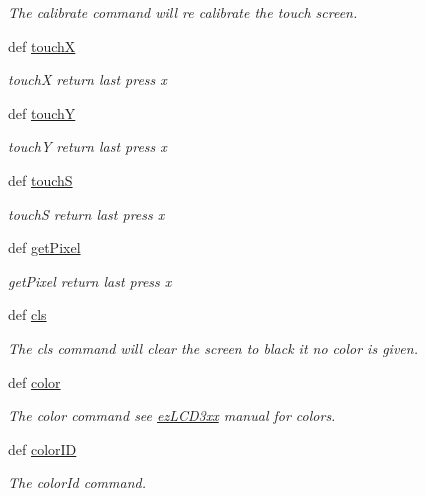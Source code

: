 \begin{DoxyCompactItemize}
\begin{DoxyCompactList}\small\item\em The calibrate command will re calibrate the touch screen. \end{DoxyCompactList}\item 
def \hyperlink{group___general_ga57f60e1c88c6963a00e45c55e9950336}{touch\-X}
\begin{DoxyCompactList}\small\item\em touch\-X return last press x \end{DoxyCompactList}\item 
def \hyperlink{group___general_ga57d446717fa3289cd0153b491334d697}{touch\-Y}
\begin{DoxyCompactList}\small\item\em touch\-Y return last press x \end{DoxyCompactList}\item 
def \hyperlink{group___general_ga658420cb53a746e3821803b240447303}{touch\-S}
\begin{DoxyCompactList}\small\item\em touch\-S return last press x \end{DoxyCompactList}\item 
def \hyperlink{group___general_gae94e11a411afe5e9c92d94be3fc5a252}{get\-Pixel}
\begin{DoxyCompactList}\small\item\em get\-Pixel return last press x \end{DoxyCompactList}\item 
def \hyperlink{group___drawing_ga3524b7a565ceaa5e5290a94e870073be}{cls}
\begin{DoxyCompactList}\small\item\em The cls command will clear the screen to black it no color is given. \end{DoxyCompactList}\item 
def \hyperlink{group___drawing_ga39b2d04e242f81f928f6e130e6fab2c7}{color}
\begin{DoxyCompactList}\small\item\em The color command see \hyperlink{namespacemodule_1_1ez_l_c_d3xx}{ez\-L\-C\-D3xx} manual for colors. \end{DoxyCompactList}\item 
def \hyperlink{group___drawing_gaef16bad290f3f042f89d2eb684819400}{color\-I\-D}
\begin{DoxyCompactList}\small\item\em The color\-Id command. \end{DoxyCompactList}\item 

\end{DoxyCompactItemize}
